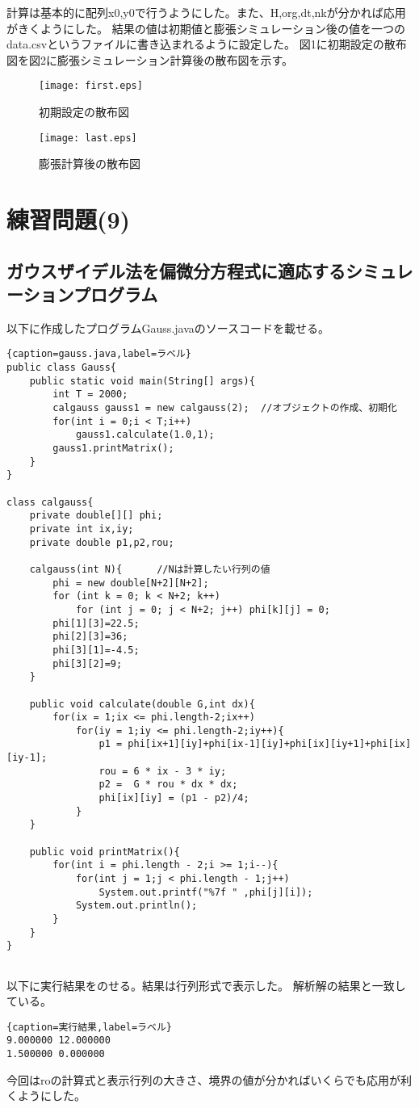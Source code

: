 \documentclass[a4j,11pt]{jarticle}
\begin{document}
計算は基本的に配列x0,y0で行うようにした。また、H,org,dt,nkが分かれば応用がきくようにした。
結果の値は初期値と膨張シミュレーション後の値を一つのdata.csvというファイルに書き込まれるように設定した。
図1に初期設定の散布図を図2に膨張シミュレーション計算後の散布図を示す。
\begin{figure}[htbp]
\begin{center}
\texttt{[image: first.eps]}
\end{center}
\caption{初期設定の散布図}
\label{fig:one}
\end{figure}


\begin{figure}[htbp]
\begin{center}
\texttt{[image: last.eps]}
\end{center}
\caption{膨張計算後の散布図}
\label{fig:one}
\end{figure}


\section*{練習問題(9)}
\subsection*{ガウスザイデル法を偏微分方程式に適応するシミュレーションプログラム}

以下に作成したプログラムGauss.javaのソースコードを載せる。
\begin{lstlisting}{caption=gauss.java,label=ラベル}
public class Gauss{
    public static void main(String[] args){
        int T = 2000;
        calgauss gauss1 = new calgauss(2);  //オブジェクトの作成、初期化
        for(int i = 0;i < T;i++) 
            gauss1.calculate(1.0,1);
        gauss1.printMatrix();
    }
}

class calgauss{
    private double[][] phi;
    private int ix,iy;
    private double p1,p2,rou;

    calgauss(int N){      //Nは計算したい行列の値
        phi = new double[N+2][N+2];
        for (int k = 0; k < N+2; k++) 
            for (int j = 0; j < N+2; j++) phi[k][j] = 0;
        phi[1][3]=22.5;
        phi[2][3]=36;
        phi[3][1]=-4.5;
        phi[3][2]=9;
    }

    public void calculate(double G,int dx){
        for(ix = 1;ix <= phi.length-2;ix++)
            for(iy = 1;iy <= phi.length-2;iy++){
                p1 = phi[ix+1][iy]+phi[ix-1][iy]+phi[ix][iy+1]+phi[ix][iy-1];
                rou = 6 * ix - 3 * iy;
                p2 =  G * rou * dx * dx;
                phi[ix][iy] = (p1 - p2)/4;
            }
    }

    public void printMatrix(){
        for(int i = phi.length - 2;i >= 1;i--){
            for(int j = 1;j < phi.length - 1;j++)
                System.out.printf("%7f " ,phi[j][i]);
            System.out.println();
        }
    }
}


\end{lstlisting}

以下に実行結果をのせる。結果は行列形式で表示した。
解析解の結果と一致している。
\begin{lstlisting}{caption=実行結果,label=ラベル}
9.000000 12.000000 
1.500000 0.000000 
\end{lstlisting}    
今回はroの計算式と表示行列の大きさ、境界の値が分かればいくらでも応用が利くようにした。
\end{document}

